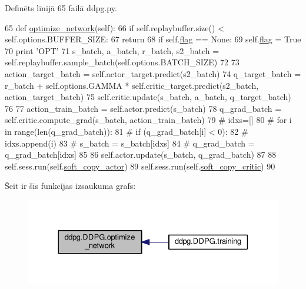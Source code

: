 Definēts līnijā 65 failā ddpg.\+py.


\begin{DoxyCode}
65     \textcolor{keyword}{def }\hyperlink{classddpg_1_1_d_d_p_g_a06c8a226bfc7c56f33a74da00ed8bcec}{optimize\_network}(self):
66         \textcolor{keywordflow}{if} self.replaybuffer.size() < self.options.BUFFER\_SIZE:
67             \textcolor{keywordflow}{return}
68         \textcolor{keywordflow}{if} self.\hyperlink{classddpg_1_1_d_d_p_g_ae456a944d9035ea92e16b3b5d9852dcb}{flag} == \textcolor{keywordtype}{None}:
69             self.\hyperlink{classddpg_1_1_d_d_p_g_ae456a944d9035ea92e16b3b5d9852dcb}{flag} = \textcolor{keyword}{True}
70             \textcolor{keywordflow}{print} \textcolor{stringliteral}{'OPT'}
71         s\_batch, a\_batch, r\_batch, s2\_batch = self.replaybuffer.sample\_batch(self.options.BATCH\_SIZE)
72 
73         action\_target\_batch = self.actor\_target.predict(s2\_batch)
74         q\_target\_batch = r\_batch + self.options.GAMMA * self.critic\_target.predict(s2\_batch, 
      action\_target\_batch)
75         self.critic.update(s\_batch, a\_batch, q\_target\_batch)
76 
77         action\_train\_batch = self.actor.predict(s\_batch)
78         q\_grad\_batch = self.critic.compute\_grad(s\_batch, action\_train\_batch)
79         \textcolor{comment}{# idxs=[]}
80         \textcolor{comment}{# for i in range(len(q\_grad\_batch)):}
81         \textcolor{comment}{#   if (q\_grad\_batch[i] < 0):}
82         \textcolor{comment}{#       idxs.append(i)}
83         \textcolor{comment}{# s\_batch = s\_batch[idxs]}
84         \textcolor{comment}{# q\_grad\_batch = q\_grad\_batch[idxs]}
85 
86         self.actor.update(s\_batch, q\_grad\_batch)
87 
88         self.sess.run(self.\hyperlink{classddpg_1_1_d_d_p_g_a2bb041b9ab7c84c83f584a1eae593a87}{soft\_copy\_actor})  
89         self.sess.run(self.\hyperlink{classddpg_1_1_d_d_p_g_a01b575596a4ae50a5ee3656ce9529c94}{soft\_copy\_critic})    
90 
\end{DoxyCode}


Šeit ir šīs funkcijas izsaukuma grafs\+:
\nopagebreak
\begin{figure}[H]
\begin{center}
\leavevmode
\includegraphics[width=330pt]{classddpg_1_1_d_d_p_g_a06c8a226bfc7c56f33a74da00ed8bcec_icgraph}
\end{center}
\end{figure}


